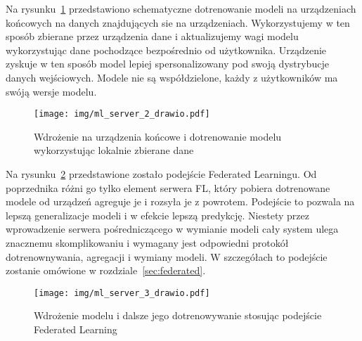 Na rysunku~\ref{fig:deploy-2} przedstawiono schematyczne dotrenowanie modeli na urządzeniach
końcowych na danych znajdujących sie na urządzeniach. Wykorzystujemy w ten sposób zbierane przez
urządzenia dane i aktualizujemy wagi modelu wykorzystując dane pochodzące bezpośrednio od
użytkownika. Urządzenie zyskuje w ten sposób model
lepiej spersonalizowany pod swoją dystrybucje danych wejściowych. Modele nie są współdzielone,
każdy z użytkowników ma swóją wersje modelu.

\begin{figure}[h!]
    \centering
    \texttt{[image: img/ml\_server\_2\_drawio.pdf]}
    \caption{Wdrożenie na urządzenia końcowe i dotrenowanie modelu wykorzystując lokalnie zbierane dane}
    \label{fig:deploy-2}
    \vspace{-4mm}
\end{figure}

Na rysunku~\ref{fig:deploy-3} przedstawione zostało podejście Federated Learningu. Od poprzednika
różni go tylko element serwera FL, który pobiera dotrenowane modele od urządzeń agreguje je i
rozsyła je z powrotem. Podejście to pozwala na lepszą generalizacje modeli i w efekcie lepszą
predykcję. Niestety przez wprowadzenie serwera pośredniczącego w wymianie modeli cały system
ulega znacznemu skomplikowaniu i wymagany jest odpowiedni protokół dotrenownywania, agregacji i
wymiany modeli. W szczegółach to podejście zostanie omówione w rozdziale~\ref{sec:federated}.

\begin{figure}[h!]
    \centering
    \texttt{[image: img/ml\_server\_3\_drawio.pdf]}
    \caption{Wdrożenie modelu i dalsze jego dotrenowywanie stosując podejście Federated Learning}
    \label{fig:deploy-3}
    \vspace{-4mm}
\end{figure}
